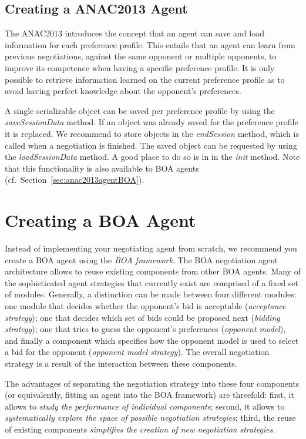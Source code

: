 \documentclass[]{article}
\begin{document}
\subsection{Creating a ANAC2013 Agent}\label{sec:anac2013agent}
The ANAC2013 introduces the concept that an agent can save and load information for each preference profile. This entails that an agent can learn from previous negotiations, against the same opponent or multiple opponents, to improve its competence when having a specific preference profile. It is only possible to retrieve information learned on the current preference profile as to avoid having perfect knowledge about the opponent's preferences.

A single serializable object can be saved per preference profile by using the \textit{saveSessionData} method. If an object was already saved for the preference profile it is replaced. We recommend to store objects in the \textit{endSession} method, which is called when a negotiation is finished. The saved object can be requested by using the \textit{loadSessionData} method. A good place to do so is in in the \textit{init} method. Note that this functionality is also available to BOA agents (cf.\ Section~\ref{sec:anac2013agentBOA}).


\section{Creating a BOA Agent}\label{sec:boa}
Instead of implementing your negotiating agent from scratch, we recommend you create a BOA agent using the \textit{BOA framework}. The BOA negotiation agent architecture allows to reuse existing components from other BOA agents. Many of the sophisticated agent strategies that currently exist are comprised of a fixed set of modules. Generally, a distinction can be made between four different modules: one module that decides whether the opponent's bid is acceptable (\textit{acceptance strategy}); one that decides which set of bids could be proposed next (\textit{bidding strategy}); one that tries to guess the opponent's preferences (\textit{opponent model}), and finally a component which specifies how the opponent model is used to select a bid for the opponent (\textit{opponent model strategy}). The overall negotiation strategy is a result of the interaction between these components.

The advantages of separating the negotiation strategy into these four components (or equivalently, fitting an agent into the BOA framework) are threefold: first, it allows to \textit{study the performance of individual components}; second, it allows to \textit{systematically explore the space of possible negotiation strategies}; third, the reuse of existing components \textit{simplifies the creation of new negotiation strategies}.
\end{document}

